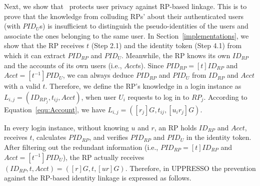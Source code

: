 {{%



Next, we show that \usso~protects user privacy against RP-based linkage. This is to prove that the knowledge from colluding RPs' about their authenticated users (with $PID_U$s) is insufficient to distinguish the pseudo-identities of the users and associate the ones belonging to the same user. In Section~\ref{implementations}, we show that the RP receives $t$ (Step 2.1) and the identity token (Step 4.1) from which it can extract $PID_{RP}$ and $PID_U$. Meanwhile, the RP knows its own $ID_{RP}$ and the accounts of its own users (i.e., $Acct$s). Since $PID_{RP}= [t]{ID_{RP}}$ and $Acct = [t^{-1}]PID_{U}$, we can always deduce $PID_{RP}$ and $PID_U$ from $ID_{RP}$ and $Acct$ with a valid $t$. Therefore, we define the RP's knowledge in a login instance as $L_{i, j}=(ID_{RP_j}, t_{ij}, Acct)$, when user $U_i$ requests to log in to $RP_j$. According to Equation~\ref{equ:Account}, we have $L_{i, j}=([r_j]G, t_{ij}, [u_ir_j]G)$.

\oldc

\vspace{1mm}
In every login instance, without knowing $u$ and $r$, an RP holds $ID_{RP}$ and $Acct$, receives $t$, calculates $PID_{RP}$, and verifies $PID_{RP}$ and $PID_U$ in the identity token. After filtering out the redundant information (i.e., $PID_{RP}= [t]{ID_{RP}}$ and $Acct = [t^{-1}]PID_{U}$), the RP actually receives $(ID_{RP}, t, Acct) = ([r]G, t, [ur]G)$. Therefore, in UPPRESSO the prevention against the RP-based identity linkage is expressed as follows.

}}
